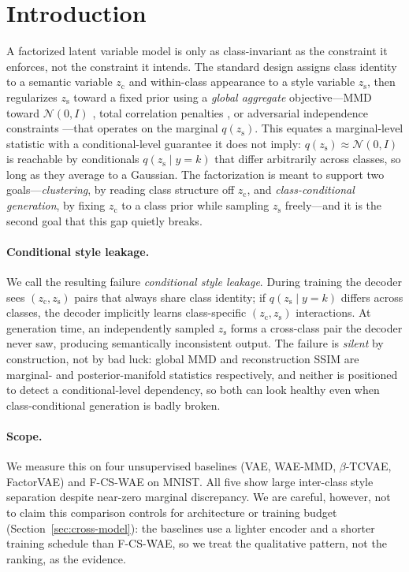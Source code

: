 \documentclass[10pt,letterpaper]{article}
\newcommand{\ours}{F-CS-WAE}
\newcommand{\zc}{z_{\mathrm{c}}}
\newcommand{\zs}{z_{\mathrm{s}}}
\begin{document}
\section{Introduction}

A factorized latent variable model is only as class-invariant as the
constraint it enforces, not the constraint it intends. The standard design
assigns class identity to a semantic variable $\zc$ and within-class
appearance to a style variable $\zs$, then regularizes $\zs$ toward a fixed
prior using a \emph{global aggregate} objective---MMD toward
$\mathcal{N}(0,I)$ \citep{tolstikhin2017wasserstein}, total correlation
penalties \citep{kim2018disentangling,chen2018isolating}, or adversarial
independence constraints \citep{chen2016infogan}---that operates on the
marginal $q(\zs)$. This equates a marginal-level statistic with a
conditional-level guarantee it does not imply: $q(\zs)\approx\mathcal{N}(0,I)$
is reachable by conditionals $q(\zs\mid y{=}k)$ that differ arbitrarily
across classes, so long as they average to a Gaussian. The factorization is
meant to support two goals---\emph{clustering}, by reading class structure
off $\zc$, and \emph{class-conditional generation}, by fixing $\zc$ to a
class prior while sampling $\zs$ freely---and it is the second goal that
this gap quietly breaks.

\paragraph{Conditional style leakage.}
We call the resulting failure \emph{conditional style leakage}. During
training the decoder sees $(\zc,\zs)$ pairs that always share class identity;
if $q(\zs\mid y{=}k)$ differs across classes, the decoder implicitly learns
class-specific $(\zc,\zs)$ interactions. At generation time, an independently
sampled $\zs$ forms a cross-class pair the decoder never saw, producing
semantically inconsistent output. The failure is \emph{silent} by
construction, not by bad luck: global MMD and reconstruction SSIM are
marginal- and posterior-manifold statistics respectively, and neither is
positioned to detect a conditional-level dependency, so both can look
healthy even when class-conditional generation is badly broken.

\paragraph{Scope.}
We measure this on four unsupervised baselines (VAE, WAE-MMD, $\beta$-TCVAE,
FactorVAE) and \ours{} on MNIST. All five show large inter-class style
separation despite near-zero marginal discrepancy. We are careful, however,
not to claim this comparison controls for architecture or training budget
(Section~\ref{sec:cross-model}): the baselines use a lighter encoder and a
shorter training schedule than \ours{}, so we treat the qualitative pattern,
not the ranking, as the evidence.
\end{document}
